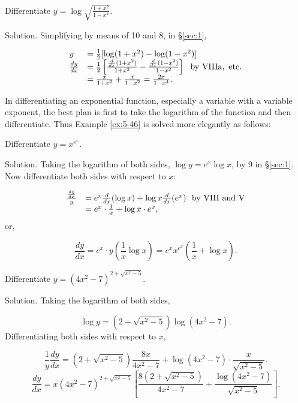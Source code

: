 \begin{example}
{\rm
Differentiate $y = \log \sqrt{\frac{1 + x^2}{1 - x^2}}$.

Solution. Simplifying by means of 10 and 8, in \S \ref{sec:1}, %

\[
\begin{array}{ll}
  	y 	&= \frac{1}{2} [ \log (1 + x^2) - \log (1 - x^2) ]\\
\frac{dy}{dx} 	
&= \frac{1}{2} \left [ \frac{\frac{d}{dx} (1 + x^2)}{1 + x^2} 
- \frac{\frac{d}{dx} (1 - x^2)}{1 - x^2} \right ]   \ \ {\rm by\ VIIIa,\ etc.}\\
&  	= \frac{x}{1 + x^2} + \frac{x}{1 - x^2} = \frac{2x}{1 - x^4}. 
\end{array}
\]
}
\end{example}

In differentiating an exponential function, especially a variable 
with a variable exponent, the best plan is first to take the logarithm of 
the function and then differentiate. Thus Example \ref{ex:5-46} %
is solved more elegantly as follows:

\begin{example}
{\rm
Differentiate $y = x^{e^x}$.

Solution. Taking the logarithm of both sides, $\log y = e^x\log x$, by 9 in \S \ref{sec:1}.
Now differentiate both sides with respect to $x$:

\[
\begin{array}{ll}
\frac{\frac{dy}{dx}}{y} 
&	= e^x \frac{d}{dx} (\log x) + \log x \frac{d}{dx} (e^x)   \ \ {\rm by\ VIII\ and\ V}\\
&  	= e^x \cdot \frac{1}{x} + \log x \cdot e^x,
\end{array}
\]
or, 	

\[
\frac{dy}{dx} 	= e^x \cdot y \left ( \frac{1}{x} \log x \right )
  	= e^x x^{e^x} \left ( \frac{1}{x} + \log x \right ).
\]
}
\end{example}

\begin{example}
{\rm
Differentiate $y = (4x^2 - 7)^{2 + \sqrt{x^2 - 5}}$.

Solution. Taking the logarithm of both sides,

\[
    \log y = (2 + \sqrt{x^2 - 5}) \log (4x^2 - 7).
\]
Differentiating both sides with respect to $x$,

\[
    \frac{1}{y} \frac{dy}{dx} 	= (2 + \sqrt{x^2 - 5}) \frac{8x}{4x^2 - 7} + \log(4x^2 - 7) \cdot \frac{x}{\sqrt{x^2 - 5}}.
\]
\[
    \frac{dy}{dx} 	= x(4x^2 - 7)^{2 + \sqrt{x^2 - 5}} \left [ \frac{8(2 + \sqrt{x^2 - 5})}{4x^2 - 7} + \frac{\log (4x^2 - 7)}{\sqrt{x^2 - 5}} \right ]. 
\]
}
\end{example}

